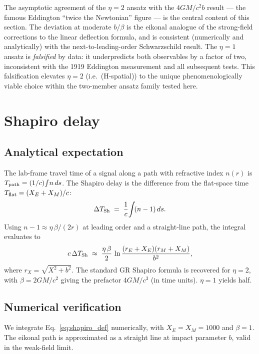 \documentclass[11pt,a4paper]{article}
\begin{document}
The asymptotic agreement of the $\eta = 2$ ansatz with the
$4GM/c^2 b$ result --- the famous Eddington \cite{eddington1919}
``twice the Newtonian'' figure --- is the central content of this
section. The deviation at moderate $b/\beta$ is the eikonal
analogue of the strong-field corrections to the linear deflection
formula, and is consistent (numerically and analytically) with
the next-to-leading-order Schwarzschild result. The $\eta = 1$
ansatz is \emph{falsified} by data: it underpredicts both
observables by a factor of two, inconsistent with the 1919
Eddington measurement and all subsequent tests. This
falsification elevates $\eta = 2$ (i.e.\ (H-spatial)) to the
unique phenomenologically viable choice within the two-member
ansatz family tested here.

\section{Shapiro delay}
\label{sec:shapiro}

\subsection{Analytical expectation}

The lab-frame travel time of a signal along a path with
refractive index $n(r)$ is $T_{\rm path} = (1/c)\!\int\! n\, ds$.
The Shapiro delay is the difference from the flat-space time
$T_{\rm flat} = (X_E + X_M)/c$:
\begin{equation}
\Delta T_{\rm Sh}
\;=\; \frac{1}{c}\!\int\!(n - 1)\,ds.
\label{eq:shapiro_def}
\end{equation}
Using $n - 1 \approx \eta\,\beta/(2 r)$ at leading order and a
straight-line path, the integral evaluates to
\begin{equation}
c\,\Delta T_{\rm Sh}
\;\approx\; \frac{\eta\,\beta}{2}\,
\ln\frac{(r_E + X_E)(r_M + X_M)}{b^2},
\label{eq:shapiro_analytic}
\end{equation}
where $r_X = \sqrt{X^2 + b^2}$. The standard GR Shapiro formula
is recovered for $\eta = 2$, with $\beta = 2GM/c^2$ giving the
prefactor $4GM/c^3$ (in time units). $\eta = 1$ yields half.

\subsection{Numerical verification}

We integrate Eq.~\eqref{eq:shapiro_def} numerically, with
$X_E = X_M = 1000$ and $\beta = 1$. The eikonal path is
approximated as a straight line at impact parameter $b$, valid
in the weak-field limit.
\end{document}

